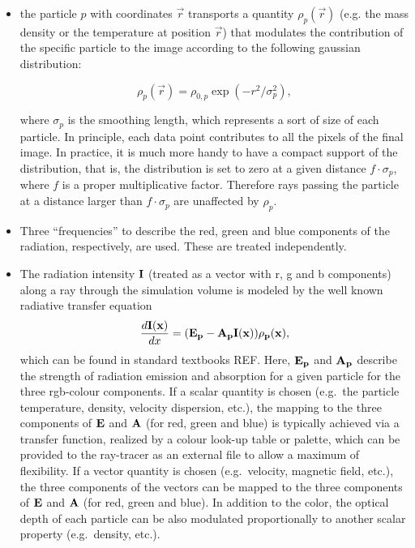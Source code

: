 \documentclass[11pt]{article}
\begin{document}
\begin{itemize}
\item
the particle $p$ with coordinates $\vec r$ transports a quantity $\rho_p(\vec r)$ 
(e.g. the mass density or the temperature at position $\vec r$)
that modulates the contribution of the specific particle to the image
according to the following gaussian distribution: 

\begin{equation}\label{smooth}
\rho_p(\vec r)=\rho_{0,p}\exp(-r^2/\sigma_p^2),
\end{equation}

where $\sigma_p$ is the smoothing length, which represents
a sort of size of each particle.  
In principle, each data point contributes to all the pixels of the final image.
In practice, it is much more handy to have a compact support of the
distribution, that is, the distribution is set to zero at a given
distance $f\cdot\sigma_p$, where $f$ is a proper multiplicative factor.
Therefore rays passing
the particle at a distance larger than $f\cdot\sigma_p$ are
unaffected by $\rho_p$.

\item
Three ``frequencies'' to describe the red, green and blue
components of the radiation, respectively, are used. These are treated independently.

\item
The radiation intensity $\bf{I}$ (treated
as a vector with r, g and b components) along a ray through the simulation
volume is modeled by the well known radiative transfer equation
\begin{equation}\label{rad}
\frac{d\bf{I}(x)}{dx}=(\bf{E}_p-\bf{A}_p\bf{I}(x))\rho_p(x),
\end{equation}
which can be found in standard textbooks REF.
Here, $\bf{E}_p$ and $\bf{A}_p$ describe the strength of radiation emission and absorption
for a given particle for the three rgb-colour components. 
If a scalar quantity is chosen (e.g.\ the particle temperature,
density, velocity dispersion, etc.), the mapping to the three components of $\bf{E}$ and $\bf{A}$ (for red, green and blue)
is typically achieved via a transfer function, realized by a colour look-up table or palette, which can
be provided to the ray-tracer as an external file to allow a maximum of flexibility. If a
vector quantity is chosen (e.g.\ velocity, magnetic field, etc.), the three components of the vectors
can be mapped to the three components of $\bf{E}$ and $\bf{A}$ (for red, green and blue). In addition
to the color, the optical depth of each particle can be also modulated proportionally to another
scalar property (e.g.\ density, etc.).
\end{itemize}
\end{document}
